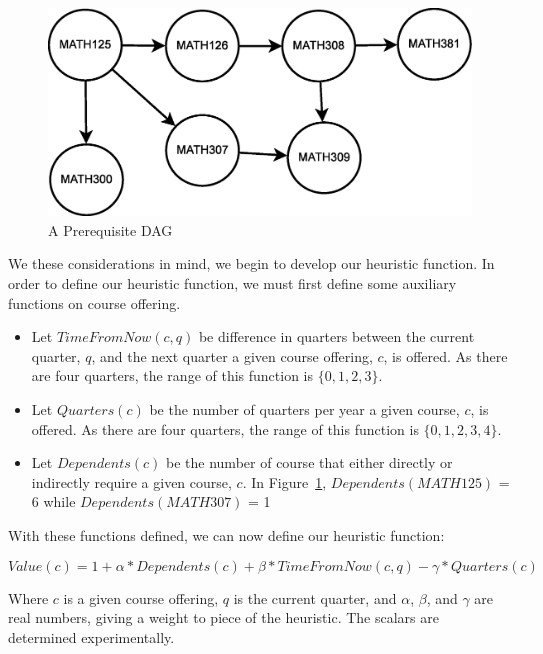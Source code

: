\documentclass[11pt]{article} %
\begin{document}
\begin{figure} [ht]
    \begin{center}
        \includegraphics[scale=0.35]{more_prereq_tree}
    \end{center}
    \caption{A Prerequisite DAG}
    \label{prereq}
\end{figure}

We these considerations in mind, we begin to develop our heuristic function. In
order to define our heuristic function, we must first define some auxiliary
functions on course offering.  \begin{itemize} \item Let $TimeFromNow(c, q)$ be
difference in quarters between the current quarter, $q$, and the next quarter
a given course offering, $c$, is offered. As there are four quarters, the range
of this function is $\{0, 1, 2, 3\}$.  \item Let $Quarters(c)$ be the number of
quarters per year a given course, $c$, is offered. As there are four quarters,
the range of this function is $\{0, 1, 2, 3, 4\}$.  \item Let $Dependents(c)$ be
the number of course that either directly or indirectly require a given course,
$c$. In Figure~\ref{prereq}, $Dependents(MATH125)$ = 6 while
$Dependents(MATH307)$ = 1 \end{itemize}

With these functions defined, we can now define our heuristic function:

\begin{equation} 
    Value(c) = 1 + \alpha * Dependents(c) + \beta * TimeFromNow(c,q) 
    - \gamma * Quarters(c)
    \label{value_func}
\end{equation} 

Where $c$ is a given course offering, $q$ is the current quarter, and $\alpha$,
$\beta$, and $\gamma$ are real numbers, giving a weight to piece of the
heuristic. The scalars are determined experimentally.  
\end{document}

